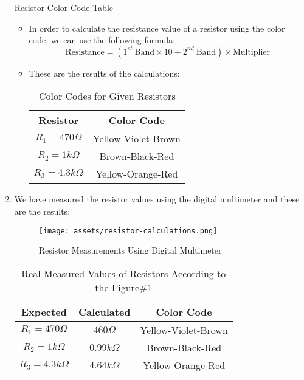 \begin{enumerate}
\begin{table}[h]
        \caption{Resistor Color Code Table \cite{resistor-calculator}}
    \end{table}
    \begin{itemize}
        \item In order to calculate the resistance value of a resistor using the color code, we can use the following formula:
        \[\text{Resistance} = (1^{st}~\text{Band} \times 10 + 2^{nd}~\text{Band}) \times \text{Multiplier}\]
        \item These are the results of the calculations:
        \begin{table}[h]
            \centering
            \begin{tabular}{|c|c|}
                \hline
                Resistor & Color Code \\
                \hline
                \(R_1 = 470\Omega\) & Yellow-Violet-Brown \\
                \(R_2 = 1k\Omega\) & Brown-Black-Red \\
                \(R_3 = 4.3k\Omega\) & Yellow-Orange-Red \\
                \hline
            \end{tabular}
            \caption{Color Codes for Given Resistors}
        \end{table}
    \end{itemize}
    
    \newpage
    \thispagestyle{plain}
    
    \item We have measured the resistor values using the digital multimeter and these are the results:
    \begin{figure}[h]
        \centering
        \texttt{[image: assets/resistor-calculations.png]}
        \caption{Resistor Measurements Using Digital Multimeter}
        \label{measured-resistors}
    \end{figure}
    \begin{table}[h]
        \centering
        \begin{tabular}{|c|c|c|}
            \hline
            Expected & Calculated & Color Code \\
            \hline
            \(R_1 = 470\Omega\) & \(460\Omega\) & Yellow-Violet-Brown \\
            \(R_2 = 1k\Omega\) & \(0.99k\Omega\) & Brown-Black-Red \\
            \(R_3 = 4.3k\Omega\) & \(4.64k\Omega\) & Yellow-Orange-Red \\
            \hline
        \end{tabular}
        \caption{Real Measured Values of Resistors According to the Figure\#\ref{measured-resistors}}
    \end{table}
\end{enumerate}

